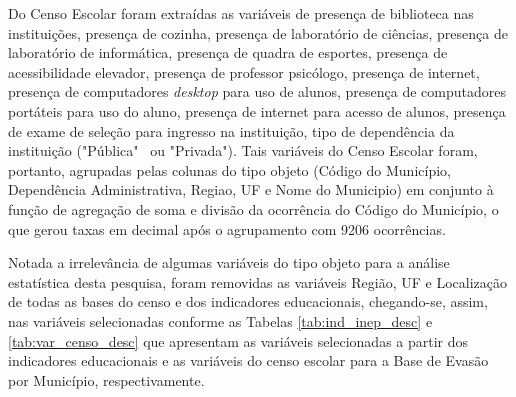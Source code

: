 \documentclass[english, spanish, brazilian]{RBIEarticle} %
\begin{document}
Do Censo Escolar foram extraídas as variáveis de presença de biblioteca nas instituições, presença de cozinha, presença de laboratório de ciências, presença de laboratório de informática, presença de quadra de esportes, presença de acessibilidade elevador, presença de professor psicólogo, presença de internet, presença de computadores \textit{desktop} para uso de alunos, presença de computadores portáteis para uso do aluno, presença de internet para acesso de alunos, presença de exame de seleção para ingresso na instituição, tipo de dependência da instituição ("Pública" ~ou "Privada"). Tais variáveis do Censo Escolar foram, portanto, agrupadas pelas colunas do tipo objeto (Código do Município, Dependência Administrativa, Regiao, UF e Nome do Municipio) em conjunto à função de agregação de soma e divisão da ocorrência do Código do Município, o que gerou taxas em decimal após o agrupamento com 9206 ocorrências.

Notada a irrelevância de algumas variáveis do tipo objeto para a análise estatística desta pesquisa, foram removidas as variáveis Região, UF e Localização de todas as bases do censo e dos indicadores educacionais, chegando-se, assim, nas variáveis selecionadas conforme as Tabelas \ref{tab:ind_inep_desc} e \ref{tab:var_censo_desc} que apresentam as variáveis selecionadas a partir dos indicadores educacionais e as variáveis do censo escolar para a Base de Evasão por Município, respectivamente.
\end{document}
